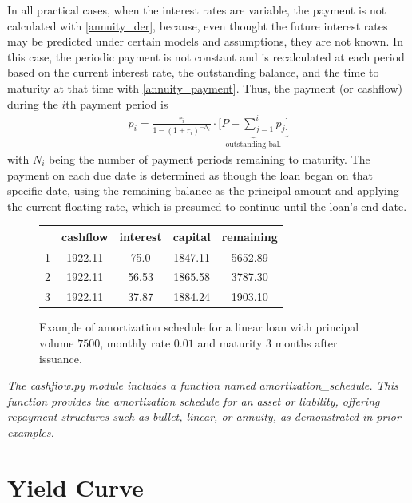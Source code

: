 \documentclass[11pt]{article}
\begin{document}
In all practical cases, when the interest rates are variable, the payment is not calculated with \eqref{annuity_der}, because, even thought the future interest rates may be predicted under certain models and assumptions, they are not known. In this case, the periodic payment is not constant and is recalculated at each period based on the current interest rate, the outstanding balance, and the time to maturity at that time with \eqref{annuity_payment}. Thus, the payment (or cashflow) during the $i$th payment period is
\begin{align}
	p_i=\frac{r_i}{1-(1+r_i)^{-N_i}}\cdot \underbrace{\bigg [P-\sum_{j=1}^ip_j\bigg]}_{\text{outstanding bal.}}
	\label{annuity}
\end{align}
with $N_i$ being the number of payment periods remaining to maturity. The payment on each due date is determined as though the loan began on that specific date, using the remaining balance as the principal amount and applying the current floating rate, which is presumed to continue until the loan's end date.
\begin{figure}[ht!]
	\centering
	\begin{tabular}{|c|c|c|c|c|}
		\hline
		& cashflow & interest & capital & remaining\\
		\hline
		1 & 1922.11 & 75.0 & 1847.11 & 5652.89\\
		\hline
		2 & 1922.11 & 56.53 & 1865.58 & 3787.30\\
		\hline
		3 & 1922.11 & 37.87 & 1884.24 & 1903.10\\
		\hline
	\end{tabular}
	\caption{Example of amortization schedule for a linear loan with principal volume $7500$, monthly rate $0.01$ and maturity 3 months after issuance.}
\end{figure}

\textit{The cashflow.py module includes a function named amortization\_schedule. This function provides the amortization schedule for an asset or liability, offering repayment structures such as bullet, linear, or annuity, as demonstrated in prior examples.}

\section{Yield Curve}
\end{document}
